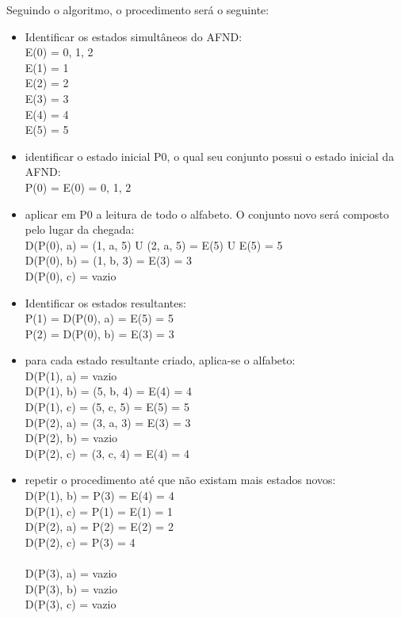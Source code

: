 \documentclass[a4paper,10pt]{article} %
\begin{document}
{Seguindo o algoritmo, o procedimento será o seguinte:
    \begin{itemize}
        \item Identificar os estados simultâneos do AFND:
            \\E(0) = {0, 1, 2}\\E(1) = {1}\\E(2) = {2}\\E(3) = {3}\\E(4) = {4}\\E(5) = {5}
        \item identificar o estado inicial P0, o qual seu conjunto possui o estado inicial da AFND:
            \\P(0) = E(0) = {0, 1, 2}
        \item aplicar em P0 a leitura de todo o alfabeto. O conjunto novo será composto pelo lugar da chegada:
            \\D(P(0), a) = (1, a, 5) U (2, a, 5) = E(5) U E(5) = {5}\\D(P(0), b) = (1, b, 3) = E(3) = {3}\\D(P(0), c) = vazio
        \item Identificar os estados resultantes:
            \\P(1) = D(P(0), a) = E(5) = {5}\\P(2) = D(P(0), b) = E(3) = {3}
        \item para cada estado resultante criado, aplica-se o alfabeto:
            \\D(P(1), a) = vazio\\D(P(1), b) = (5, b, 4) = E(4) = {4}\\D(P(1), c) = (5, c, 5) = E(5) = {5}
            \\D(P(2), a) = (3, a, 3) = E(3) = {3}\\D(P(2), b) = vazio\\D(P(2), c) = (3, c, 4) = E(4) = {4}
        \item repetir o procedimento até que não existam mais estados novos:
            \\D(P(1), b) = P(3) = E(4) = {4}\\D(P(1), c) = P(1) = E(1) = {1}\\D(P(2), a) = P(2) = E(2) = {2}\\D(P(2), c) = P(3) = {4}\\
            \\D(P(3), a) = vazio\\D(P(3), b) = vazio\\D(P(3), c) = vazio\\

\end{itemize}}
\end{document}
